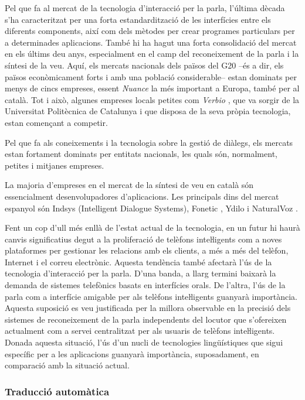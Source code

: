 \documentclass[]{../../metanetpaper}
\begin{document}
\begin{multicols}{2}
Pel que fa al mercat de la tecnologia d’interacció per la parla, l’última dècada s’ha caracteritzat per una forta estandardització de les interfícies entre els diferents components, així com dels mètodes per crear programes particulars per a determinades aplicacions. També hi ha hagut una forta consolidació del mercat en els últims deu anys, especialment en el camp del reconeixement de la parla i la síntesi de la veu. Aquí, els mercats nacionals dels països del G20 –és a dir, els països econòmicament forts i amb una població considerable– estan dominats per menys de cincs empreses, essent \textit{Nuance} la més important a Europa, també per al català. Tot i això, algunes empreses locals petites com \textit{Verbio} \cite{CAT-Nota25}, que va sorgir de la Universitat Politècnica de Catalunya i que disposa de la seva pròpia tecnologia, estan començant a competir.

Pel que fa als coneixements i la tecnologia sobre la gestió de diàlegs, els mercats estan fortament dominats per entitats nacionals, les quals són, normalment, petites i mitjanes empreses. 

La majoria d’empreses en el mercat de la síntesi de veu en català són essencialment desenvolupadores d’aplicacions. Les principals dins del mercat espanyol són Indsys \cite{CAT-Nota26} (Intelligent Dialogue Systems), Fonetic \cite{CAT-Nota27}, Ydilo \cite{CAT-Nota28} i NaturalVoz \cite{CAT-Nota29}.

Fent un cop d’ull més enllà de l’estat actual de la tecnologia, en un futur hi haurà canvis significatius degut a la proliferació de telèfons inteŀligents com a noves plataformes per gestionar les relacions amb els clients, a més a més del telèfon, Internet i el correu electrònic. Aquesta tendència també afectarà l’ús de la tecnologia d’interacció per la parla. D’una banda, a llarg termini baixarà la demanda de sistemes telefònics basats en interfícies orals. De l’altra, l’ús de la parla com a interfície amigable per als telèfons inteŀligents guanyarà importància. Aquesta suposició es veu justificada per la millora observable en la precisió dels sistemes de reconeixement de la parla independents del locutor que s’ofereixen actualment com a servei centralitzat per als usuaris de telèfons inteŀligents. Donada aquesta situació, l’ús d’un nucli de tecnologies lingüístiques que sigui específic per a les aplicacions guanyarà importància, suposadament, en comparació amb la situació actual. 

\subsubsection{Traducció automàtica}


\end{multicols}
\end{document}
